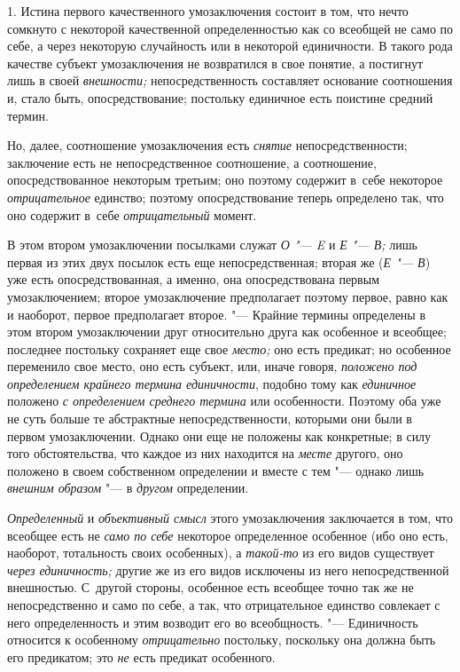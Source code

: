 1. Истина первого качественного умозаключения состоит в том,
что нечто сомкнуто с некоторой качественной определенностью как со всеобщей
не само по себе, а через некоторую случайность или в некоторой единичности.
В такого рода качестве субъект умозаключения не возвратился в свое понятие,
а постигнут лишь в своей {\em внешности;}
непосредственность составляет основание соотношения и, стало
быть, опосредствование; постольку единичное есть поистине средний термин.

Но, далее, соотношение умозаключения есть {\em снятие}
непосредственности; заключение есть не непосредственное
соотношение, а соотношение, опосредствованное некоторым третьим; оно
поэтому содержит в~себе некоторое {\em отрицательное}
единство; поэтому опосредствование теперь определено так, что
оно содержит в~себе {\em отрицательный} момент.

В этом втором умозаключении посылками служат {\em О "--- E} и {\em Е "--- В;}
лишь первая из этих двух посылок есть еще непосредственная; вторая же
({\em Е "--- В}) уже есть опосредствованная, а именно, она опосредствована
первым умозаключением; второе умозаключение предполагает поэтому первое,
равно как и наоборот, первое предполагает второе. "--- Крайние
термины определены в этом втором умозаключении друг относительно друга как
особенное и всеобщее; последнее постольку сохраняет еще свое {\em место;}
оно есть предикат; но особенное переменило свое место, оно есть субъект,
или, иначе говоря, {\em положено под определением
крайнего термина единичности}, подобно тому как
{\em единичное} положено {\em с определением среднего термина}
или особенности. Поэтому оба уже не суть больше те
абстрактные непосредственности, которыми они были в первом умозаключении.
Однако они еще не положены как конкретные; в силу того обстоятельства, что
каждое из них находится на {\em месте} другого, оно положено в своем
собственном определении и вместе с тем "--- однако лишь
{\em внешним образом} "--- в {\em другом} определении.

{\em Определенный} и {\em объективный смысл}
этого умозаключения заключается в том, что всеобщее есть не
{\em само по себе} некоторое определенное особенное (ибо оно есть, наоборот,
тотальность своих особенных), а {\em такой-то} из его видов существует
{\em через единичность;} другие же из его видов исключены из него
непосредственной внешностью. С~другой стороны, особенное есть всеобщее
точно так же не непосредственно и само по себе, а так, что отрицательное
единство совлекает с него определенность и этим возводит его во
всеобщность. "--- Единичность относится к особенному {\em отрицательно}
постольку, поскольку она должна быть его предикатом; это
{\em не} есть предикат особенного.


